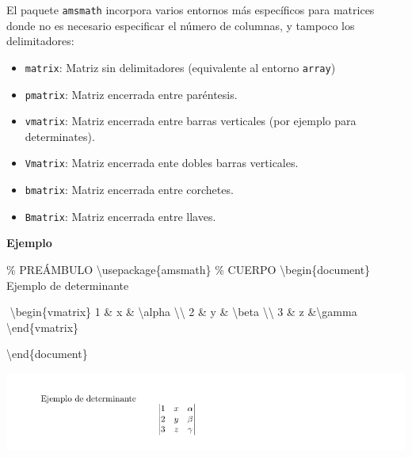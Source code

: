 \documentclass[
  letterpaper,
  DIV=11,
  numbers=noendperiod]{scrreport}
\newenvironment{Shaded}{\begin{snugshade}}{\end{snugshade}}
\newcommand{\BuiltInTok}[1]{\textcolor[rgb]{0.00,0.23,0.31}{#1}}
\newcommand{\CommentTok}[1]{\textcolor[rgb]{0.37,0.37,0.37}{#1}}
\newcommand{\ExtensionTok}[1]{\textcolor[rgb]{0.00,0.23,0.31}{#1}}
\newcommand{\KeywordTok}[1]{\textcolor[rgb]{0.00,0.23,0.31}{#1}}
\newcommand{\NormalTok}[1]{\textcolor[rgb]{0.00,0.23,0.31}{#1}}
\newcommand{\SpecialCharTok}[1]{\textcolor[rgb]{0.37,0.37,0.37}{#1}}
\newcommand{\SpecialStringTok}[1]{\textcolor[rgb]{0.13,0.47,0.30}{#1}}
\providecommand{\tightlist}{%
  \setlength{\itemsep}{0pt}\setlength{\parskip}{0pt}}\usepackage{longtable,booktabs,array}
\begin{document}
El paquete \texttt{amsmath} incorpora varios entornos más específicos
para matrices donde no es necesario especificar el número de columnas, y
tampoco los delimitadores:

\begin{itemize}
\tightlist
\item
  \texttt{matrix}: Matriz sin delimitadores (equivalente al entorno
  \texttt{array})
\item
  \texttt{pmatrix}: Matriz encerrada entre paréntesis.
\item
  \texttt{vmatrix}: Matriz encerrada entre barras verticales (por
  ejemplo para determinates).
\item
  \texttt{Vmatrix}: Matriz encerrada ente dobles barras verticales.
\item
  \texttt{bmatrix}: Matriz encerrada entre corchetes.
\item
  \texttt{Bmatrix}: Matriz encerrada entre llaves.
\end{itemize}

\textbf{Ejemplo}

\begin{Shaded}
\begin{Highlighting}[]
\CommentTok{\% PREÁMBULO}
\BuiltInTok{\textbackslash{}usepackage}\NormalTok{\{}\ExtensionTok{amsmath}\NormalTok{\}}
\CommentTok{\% CUERPO}
\KeywordTok{\textbackslash{}begin}\NormalTok{\{}\ExtensionTok{document}\NormalTok{\}}
\NormalTok{Ejemplo de determinante}

\SpecialStringTok{$$}
\KeywordTok{\textbackslash{}begin}\NormalTok{\{}\ExtensionTok{vmatrix}\NormalTok{\}}
\SpecialStringTok{1 \& x \& }\SpecialCharTok{\textbackslash{}alpha}\SpecialStringTok{ }\SpecialCharTok{\textbackslash{}\textbackslash{}}
\SpecialStringTok{2 \& y \& }\SpecialCharTok{\textbackslash{}beta}\SpecialStringTok{ }\SpecialCharTok{\textbackslash{}\textbackslash{}}
\SpecialStringTok{3 \& z \&}\SpecialCharTok{\textbackslash{}gamma}
\KeywordTok{\textbackslash{}end}\NormalTok{\{}\ExtensionTok{vmatrix}\NormalTok{\}}
\SpecialStringTok{$$}



\KeywordTok{\textbackslash{}end}\NormalTok{\{}\ExtensionTok{document}\NormalTok{\}}
\end{Highlighting}
\end{Shaded}

\begin{tcolorbox}[enhanced jigsaw, arc=.35mm, toprule=.15mm, opacitybacktitle=0.6, colback=white, coltitle=black, colbacktitle=quarto-callout-note-color!10!white, breakable, colframe=quarto-callout-note-color-frame, left=2mm, opacityback=0, bottomtitle=1mm, toptitle=1mm, titlerule=0mm, title={Salida}, bottomrule=.15mm, leftrule=.75mm, rightrule=.15mm]
\includegraphics{./img/formulas/determinante.png}
\end{tcolorbox}
\end{document}
